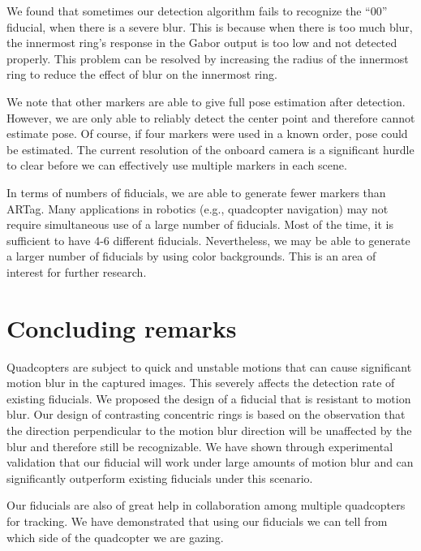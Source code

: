 We found that sometimes our detection algorithm fails to recognize the
``00'' fiducial, when there is a severe blur.  This is because when there
is too much blur, the innermost ring's response in the Gabor output is
too low and not detected properly.  This problem can be resolved by
increasing the radius of the innermost ring to reduce the effect of blur
on the innermost ring.

We note that other markers are able to give full pose estimation after
detection.  However, we are only able to reliably detect the center
point and therefore cannot estimate pose.  Of course, if four markers
were used in a known order, pose could be estimated. The current
resolution of the onboard camera is a significant  hurdle to clear before we
can effectively use multiple markers in each scene.

In terms of numbers of fiducials, we are able to generate fewer markers
than ARTag. Many applications in robotics (e.g., quadcopter navigation)
may not require simultaneous use of a large number of fiducials.  Most
of the time, it is sufficient to have 4-6 different
fiducials. Nevertheless, we may be able to generate a larger number of
fiducials by using color backgrounds. This is an area of interest for
further research.

\section{Concluding remarks}
Quadcopters are subject to quick and unstable motions that can cause
significant motion blur in the captured images. This severely affects
the detection rate of existing fiducials. We proposed the
design of a fiducial that is resistant to motion blur. Our design of
contrasting concentric rings is based on the observation that the
direction perpendicular to the motion blur direction will be
unaffected by the blur and therefore still be recognizable. We have
shown through experimental validation that our fiducial will work
under large amounts of motion blur and can significantly outperform
existing fiducials under this scenario.

Our fiducials are also of great help in collaboration among multiple
quadcopters for tracking. We have demonstrated that using our fiducials we
can tell from which side of the quadcopter we are gazing.
